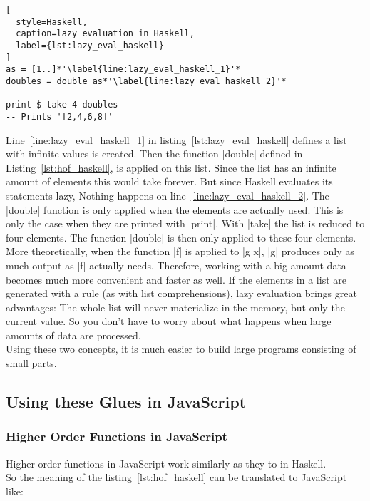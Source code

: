 \begin{lstlisting}[
  style=Haskell,
  caption=lazy evaluation in Haskell,
  label={lst:lazy_eval_haskell}
]
as = [1..]*'\label{line:lazy_eval_haskell_1}'*
doubles = double as*'\label{line:lazy_eval_haskell_2}'*

print $ take 4 doubles 
-- Prints '[2,4,6,8]'
\end{lstlisting}

Line~\ref{line:lazy_eval_haskell_1} in listing~\ref{lst:lazy_eval_haskell}
defines a list with infinite values is created. Then the function |double|
defined in Listing~\ref{lst:hof_haskell}, is applied on this list. Since the
list has an infinite amount of elements this would take forever. But since
Haskell evaluates its statements lazy, Nothing happens on
line~\ref{line:lazy_eval_haskell_2}. The |double| function is only applied when
the elements are actually used. This is only the case when they are printed
with |print|. With |take| the list is reduced to four elements. The function
|double| is then only applied to these four elements. \\ More theoretically,
when the function |f| is applied to |g x|, |g| produces only as much output as
|f| actually needs. Therefore, working with a big amount data becomes much more
convenient and faster as well. If the elements in a list are generated with a
rule (as with list comprehensions), lazy evaluation brings great advantages:
The whole list will never materialize in the memory, but only the current
value. So you don't have to worry about what happens when large amounts of data
are processed. \\ Using these two concepts, it is much easier to build large
programs consisting of small parts.

\subsection{Using these Glues in JavaScript} %
\label{sub:Using these Glues in JavaScript}

\subsubsection{Higher Order Functions in JavaScript} %
\label{subsub:Higher Order Functions in JavaScript}
Higher order functions in JavaScript work similarly as they to in Haskell. \\
So the meaning of the listing~\ref{lst:hof_haskell} can be translated to 
JavaScript like:

